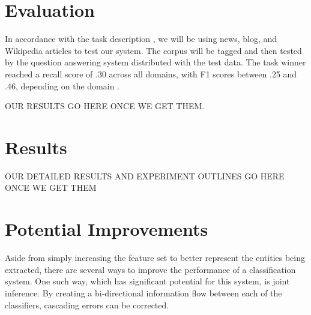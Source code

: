 \documentclass[11pt,letterpaper]{article}
\begin{document}
\section{Evaluation}

In accordance with the task description \cite{Llorens:15}, we will be using news, blog, and Wikipedia articles to test our system. The corpus will be tagged and then tested by the question answering system distributed with the test data. The task winner reached a recall score of .30 across all domains, with F1 scores between .25 and .46, depending on the domain \cite{Mirza:15}. 

OUR RESULTS GO HERE ONCE WE GET THEM.


\section{Results}

OUR DETAILED RESULTS AND EXPERIMENT OUTLINES GO HERE ONCE WE GET THEM


\section{Potential Improvements}

Aside from simply increasing the feature set to better represent the entities being extracted, there are several ways to improve the performance of a classification system. One such way, which has significant potential for this system, is joint inference. By creating a bi-directional information flow between each of the classifiers, cascading errors can be corrected. 

%

\end{document}
